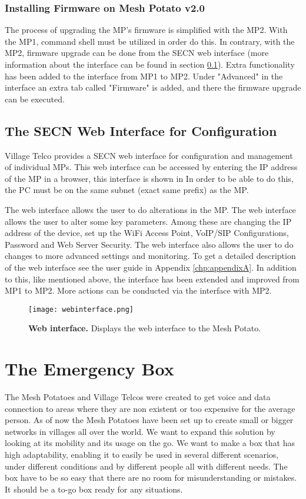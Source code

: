 \subsubsection{Installing Firmware on Mesh Potato v2.0}
The process of upgrading the MP's firmware is simplified with the MP2. With the MP1, command shell must be utilized in order do this. In contrary, with the MP2, firmware upgrade can be done from the SECN web interface (more information about the interface can be found in section \ref{subsec:interface}). Extra functionality has been added to the interface from MP1 to MP2. Under "Advanced" in the interface an extra tab called "Firmware" is added, and there the firmware upgrade can be executed. 

\subsection{The SECN Web Interface for Configuration}
\label{subsec:interface}
Village Telco provides a SECN web interface for configuration and management of individual MPs. This web interface can be accessed by entering the IP address of the MP in a browser, this interface is shown in  In order to be able to do this, the PC must be on the same subnet (exact same prefix) as the MP.  

The web interface allows the user to do alterations in the MP. The web interface allows the user to alter some key parameters. Among these are changing the IP address of the device, set up the WiFi Access Point, VoIP/SIP Configurations, Password and Web Server Security. The web interface also allows the user to do changes to more advanced settings and monitoring. To get a detailed description of the web interface see the user guide in Appendix \ref{chp:appendixA}. In addition to this, like mentioned above, the interface has been extended and improved from MP1 to MP2. More actions can be conducted via the interface with MP2. 

\begin{figure}[t]
  \centering
      \texttt{[image: webinterface.png]}
  \caption [Web interface]{\textbf{Web interface.} Displays the web interface to the Mesh Potato.}
  \label{fig:webinterface}
\end{figure}


\section{The Emergency Box}
The Mesh Potatoes and Village Telcos were created to get voice and data connection to areas where they are non existent or too expensive for the average person. As of now the Mesh Potatoes have been set up to create small or bigger networks in villages all over the world. We want to expand this solution by looking at its mobility and its usage on the go. We want to make a box that has high adaptability, enabling it to easily be used in several different scenarios, under different conditions and by different people all with different needs. The box have to be so easy that there are no room for misunderstanding or mistakes. It should be a to-go box ready for any situations.  
 
